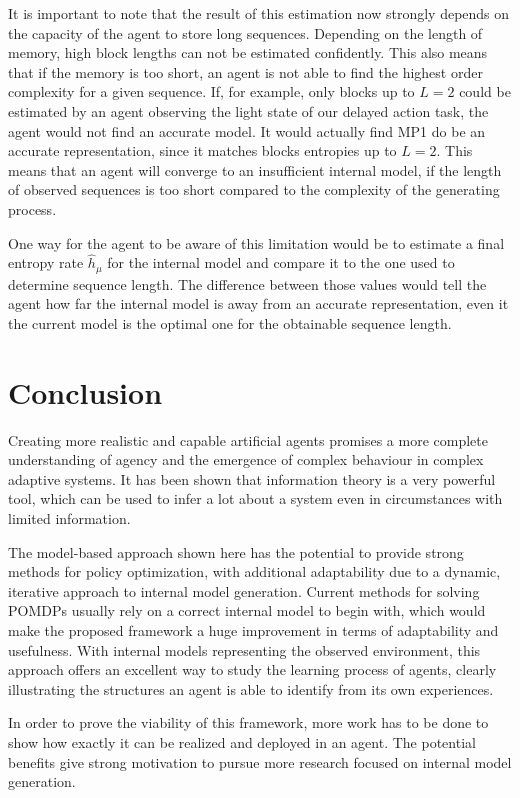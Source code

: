 \documentclass[12pt,a4paper]{article}
\begin{document}
It is important to note that the result of this estimation now strongly depends on the capacity of the agent to store long sequences.
Depending on the length of memory, high block lengths can not be estimated confidently.
This also means that if the memory is too short, an agent is not able to find the highest order complexity for a given sequence.
If, for example, only blocks up to $L=2$ could be estimated by an agent observing the light state of our delayed action task, the agent would not find an accurate model.
It would actually find MP1 do be an accurate representation, since it matches blocks entropies up to $L=2$.
This means that an agent will converge to an insufficient internal model, if the length of observed sequences is too short compared to the complexity of the generating process.

One way for the agent to be aware of this limitation would be to estimate a final entropy rate $\hat{h}_\mu$ for the internal model and compare it to the one used to determine sequence length.
The difference between those values would tell the agent how far the internal model is away from an accurate representation, even it the current model is the optimal one for the obtainable sequence length.

\newpage
\section{Conclusion} \label{sec:conclusion}
Creating more realistic and capable artificial agents promises a more complete understanding of agency and the emergence of complex behaviour in complex adaptive systems.
It has been shown that information theory is a very powerful tool, which can be used to infer a lot about a system even in circumstances with limited information.

The model-based approach shown here has the potential to provide strong methods for policy optimization, with additional adaptability due to a dynamic, iterative approach to internal model generation.
Current methods for solving POMDPs usually rely on a correct internal model to begin with, which would make the proposed framework a huge improvement in terms of adaptability and usefulness.
With internal models representing the observed environment, this approach offers an excellent way to study the learning process of agents, clearly illustrating the structures an agent is able to identify from its own experiences.

In order to prove the viability of this framework, more work has to be done to show how exactly it can be realized and deployed in an agent.
The potential benefits give strong motivation to pursue more research focused on internal model generation.
\end{document}

